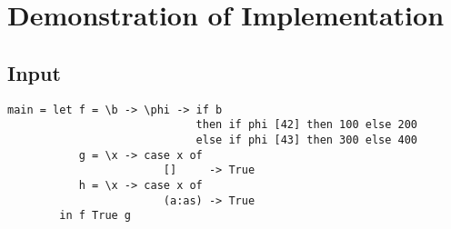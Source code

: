 \appendix

\chapter{Demonstration of Implementation}\label{appx}

\section{Input}
\begin{Verbatim}
main = let f = \b -> \phi -> if b
                             then if phi [42] then 100 else 200
                             else if phi [43] then 300 else 400
           g = \x -> case x of
                        []     -> True
           h = \x -> case x of
                        (a:as) -> True
        in f True g
\end{Verbatim}

